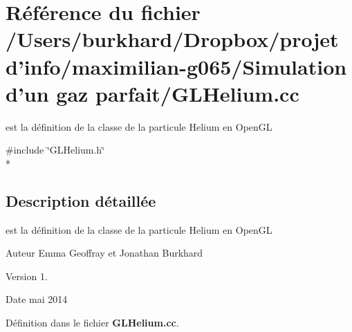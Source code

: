 \section{Référence du fichier /\+Users/burkhard/\+Dropbox/projet d'info/maximilian-\/g065/\+Simulation d'un gaz parfait/\+G\+L\+Helium.cc}
\label{_g_l_helium_8cc}


est la définition de la classe de la particule Helium en Open\+G\+L  


{\ttfamily \#include \char`\"{}G\+L\+Helium.\+h\char`\"{}}\\*


\subsection{Description détaillée}
est la définition de la classe de la particule Helium en Open\+G\+L 

\begin{DoxyAuthor}{Auteur}
Emma Geoffray et Jonathan Burkhard 
\end{DoxyAuthor}
\begin{DoxyVersion}{Version}
1. 
\end{DoxyVersion}
\begin{DoxyDate}{Date}
mai 2014 
\end{DoxyDate}


Définition dans le fichier {\bf G\+L\+Helium.\+cc}.

